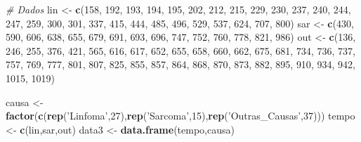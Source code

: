 \documentclass[]{article}
\newenvironment{Shaded}{\begin{snugshade}}{\end{snugshade}}
\newcommand{\KeywordTok}[1]{\textcolor[rgb]{0.13,0.29,0.53}{\textbf{#1}}}
\newcommand{\DecValTok}[1]{\textcolor[rgb]{0.00,0.00,0.81}{#1}}
\newcommand{\StringTok}[1]{\textcolor[rgb]{0.31,0.60,0.02}{#1}}
\newcommand{\CommentTok}[1]{\textcolor[rgb]{0.56,0.35,0.01}{\textit{#1}}}
\newcommand{\NormalTok}[1]{#1}
\begin{document}
\begin{Shaded}
\begin{Highlighting}[]
\CommentTok{# Dados}
\NormalTok{lin <-}\StringTok{ }\KeywordTok{c}\NormalTok{(}\DecValTok{158}\NormalTok{, }\DecValTok{192}\NormalTok{, }\DecValTok{193}\NormalTok{, }\DecValTok{194}\NormalTok{, }\DecValTok{195}\NormalTok{, }\DecValTok{202}\NormalTok{, }\DecValTok{212}\NormalTok{, }\DecValTok{215}\NormalTok{, }\DecValTok{229}\NormalTok{, }\DecValTok{230}\NormalTok{, }\DecValTok{237}\NormalTok{,}
         \DecValTok{240}\NormalTok{, }\DecValTok{244}\NormalTok{, }\DecValTok{247}\NormalTok{, }\DecValTok{259}\NormalTok{, }\DecValTok{300}\NormalTok{, }\DecValTok{301}\NormalTok{, }\DecValTok{337}\NormalTok{, }\DecValTok{415}\NormalTok{, }\DecValTok{444}\NormalTok{, }\DecValTok{485}\NormalTok{, }\DecValTok{496}\NormalTok{,}
         \DecValTok{529}\NormalTok{, }\DecValTok{537}\NormalTok{, }\DecValTok{624}\NormalTok{, }\DecValTok{707}\NormalTok{, }\DecValTok{800}\NormalTok{)}
\NormalTok{sar <-}\StringTok{  }\KeywordTok{c}\NormalTok{(}\DecValTok{430}\NormalTok{, }\DecValTok{590}\NormalTok{, }\DecValTok{606}\NormalTok{, }\DecValTok{638}\NormalTok{, }\DecValTok{655}\NormalTok{, }\DecValTok{679}\NormalTok{, }\DecValTok{691}\NormalTok{, }\DecValTok{693}\NormalTok{, }\DecValTok{696}\NormalTok{,}
          \DecValTok{747}\NormalTok{, }\DecValTok{752}\NormalTok{, }\DecValTok{760}\NormalTok{, }\DecValTok{778}\NormalTok{, }\DecValTok{821}\NormalTok{, }\DecValTok{986}\NormalTok{)}
\NormalTok{out <-}\StringTok{ }\KeywordTok{c}\NormalTok{(}\DecValTok{136}\NormalTok{, }\DecValTok{246}\NormalTok{, }\DecValTok{255}\NormalTok{, }\DecValTok{376}\NormalTok{, }\DecValTok{421}\NormalTok{, }\DecValTok{565}\NormalTok{, }\DecValTok{616}\NormalTok{, }\DecValTok{617}\NormalTok{, }\DecValTok{652}\NormalTok{, }\DecValTok{655}\NormalTok{, }\DecValTok{658}\NormalTok{,}
         \DecValTok{660}\NormalTok{, }\DecValTok{662}\NormalTok{, }\DecValTok{675}\NormalTok{, }\DecValTok{681}\NormalTok{, }\DecValTok{734}\NormalTok{, }\DecValTok{736}\NormalTok{, }\DecValTok{737}\NormalTok{, }\DecValTok{757}\NormalTok{, }\DecValTok{769}\NormalTok{, }\DecValTok{777}\NormalTok{, }\DecValTok{801}\NormalTok{,}
         \DecValTok{807}\NormalTok{, }\DecValTok{825}\NormalTok{, }\DecValTok{855}\NormalTok{, }\DecValTok{857}\NormalTok{, }\DecValTok{864}\NormalTok{, }\DecValTok{868}\NormalTok{, }\DecValTok{870}\NormalTok{, }\DecValTok{873}\NormalTok{, }\DecValTok{882}\NormalTok{, }\DecValTok{895}\NormalTok{, }\DecValTok{910}\NormalTok{,}
         \DecValTok{934}\NormalTok{, }\DecValTok{942}\NormalTok{, }\DecValTok{1015}\NormalTok{, }\DecValTok{1019}\NormalTok{)}

\NormalTok{causa <-}\StringTok{ }\KeywordTok{factor}\NormalTok{(}\KeywordTok{c}\NormalTok{(}\KeywordTok{rep}\NormalTok{(}\StringTok{'Linfoma'}\NormalTok{,}\DecValTok{27}\NormalTok{),}\KeywordTok{rep}\NormalTok{(}\StringTok{'Sarcoma'}\NormalTok{,}\DecValTok{15}\NormalTok{),}\KeywordTok{rep}\NormalTok{(}\StringTok{'Outras_Causas'}\NormalTok{,}\DecValTok{37}\NormalTok{)))}
\NormalTok{tempo <-}\StringTok{ }\KeywordTok{c}\NormalTok{(lin,sar,out)}
\NormalTok{data3 <-}\StringTok{ }\KeywordTok{data.frame}\NormalTok{(tempo,causa)}


\end{Highlighting}
\end{Shaded}
\end{document}
